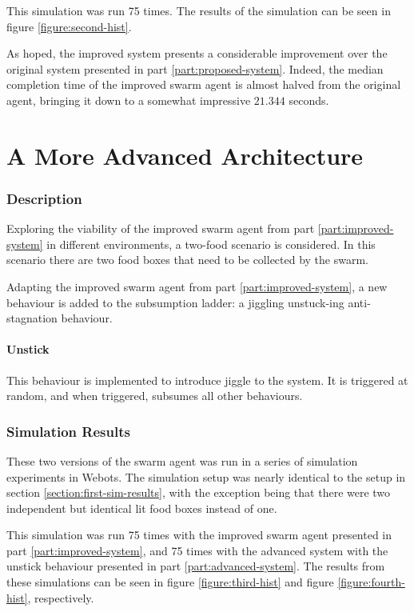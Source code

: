 \documentclass[a4paper]{article}
\begin{document}
This simulation was run 75 times.
The results of the simulation can be seen in figure \vref{figure:second-hist}.

As hoped, the improved system presents a considerable improvement over the original system presented in part \vref{part:proposed-system}.
Indeed, the median completion time of the improved swarm agent is almost halved from the original agent, bringing it down to a somewhat impressive $ 21.344 $ seconds.

\part{A More Advanced Architecture}
\label{part:advanced-system}

\section{Description}

Exploring the viability of the improved swarm agent from part \vref{part:improved-system} in different environments, a two-food scenario is considered.
In this scenario there are two food boxes that need to be collected by the swarm.

Adapting the improved swarm agent from part \ref{part:improved-system}, a new behaviour is added to the subsumption ladder: a jiggling unstuck-ing anti-stagnation behaviour.



\subsection{Unstick}
This behaviour is implemented to introduce jiggle to the system. It is triggered at random, and when triggered, subsumes all other behaviours. 

\section{Simulation Results}

These two versions of the swarm agent was run in a series of simulation experiments in Webots. The simulation setup was nearly identical to the setup in section \vref{section:first-sim-results}, with the exception being that there were two independent but identical lit food boxes instead of one.

This simulation was run 75 times with the improved swarm agent presented in part \vref{part:improved-system}, and 75 times with the advanced system with the unstick behaviour presented in part \vref{part:advanced-system}.
The results from these simulations can be seen in figure \vref{figure:third-hist} and figure \vref{figure:fourth-hist}, respectively.
\end{document}
